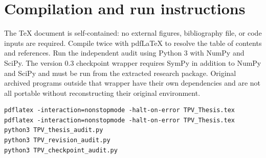 \documentclass[11pt,oneside]{report}
\begin{document}
\section{Compilation and run instructions}
The TeX document is self-contained: no external figures, bibliography file, or code inputs are required. Compile twice with pdfLaTeX to resolve the table of contents and references. Run the independent audit using Python 3 with NumPy and SciPy. The version 0.3 checkpoint wrapper requires SymPy in addition to NumPy and SciPy and must be run from the extracted research package. Original archived programs outside that wrapper have their own dependencies and are not all portable without reconstructing their original environment.
\begin{Verbatim}[breaklines=true]
pdflatex -interaction=nonstopmode -halt-on-error TPV_Thesis.tex
pdflatex -interaction=nonstopmode -halt-on-error TPV_Thesis.tex
python3 TPV_thesis_audit.py
python3 TPV_revision_audit.py
python3 TPV_checkpoint_audit.py
\end{Verbatim}
\end{document}
